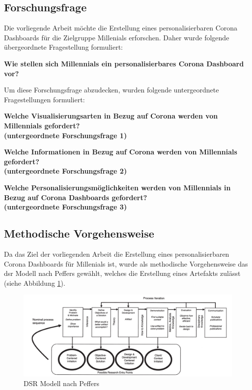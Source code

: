 \subsection{Forschungsfrage} \label{ch:introduction_research_question}
Die vorliegende Arbeit möchte die Erstellung eines personalisierbaren Corona Dashboards für die Zielgruppe Millenials erforschen. Daher wurde folgende übergeordnete Fragestellung formuliert:

\begin{center}
\textbf{Wie stellen sich Millennials ein personalisierbares Corona Dashboard vor?}
\end{center}

Um diese Forschungsfrage abzudecken, wurden folgende untergeordnete Fragestellungen formuliert:

\begin{center}
\textbf{Welche Visualisierungsarten in Bezug auf Corona werden von Millennials gefordert?\\
(untergeordnete Forschungsfrage 1)}
\end{center}

\begin{center}
\textbf{Welche Informationen in Bezug auf Corona werden von Millennials gefordert?\\
(untergeordnete Forschungsfrage 2)}
\end{center}

\begin{center}
\textbf{Welche Personalisierungsmöglichkeiten werden von Millennials in Bezug auf Corona Dashboards gefordert?\\
(untergeordnete Forschungsfrage 3)}
\end{center}

\clearpage
\subsection{Methodische Vorgehensweise}
Da das Ziel der vorliegenden Arbeit die Erstellung eines personalisierbaren Corona Dashboards für Millenials ist, wurde als methodische Vorgehensweise das \gls{dsr} Modell nach Peffers gewählt, welches die Erstellung eines Artefakts zulässt (siehe Abbildung \ref{fig:peffers_dsr_model}).

\begin{figure}[ht]
	\includegraphics[width=14cm]{images/peffers_dsr_model.png}
	\centering
	\caption{DSR Modell nach Peffers ~\citep[S. 54]{peffers}}
	\label{fig:peffers_dsr_model}
\end{figure}

